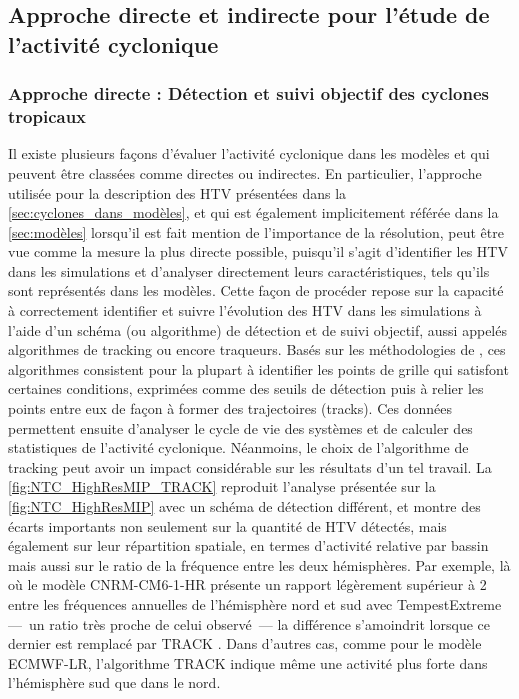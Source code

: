 \documentclass[../main.tex]{subfiles}
\begin{document}
\subsection{Approche directe et indirecte pour l'étude de l'activité cyclonique}\label{sec:tracking_vs_indices}

\subsubsection{Approche directe : Détection et suivi objectif des cyclones tropicaux}\label{sec:intro_tracking}

Il existe plusieurs façons d'évaluer l'activité cyclonique dans les modèles et qui peuvent être classées comme directes ou indirectes. En particulier,
l'approche utilisée pour la description des HTV présentées dans la \cref{sec:cyclones_dans_modèles}, et qui est également implicitement référée dans la
\cref{sec:modèles} lorsqu'il est fait mention de l'importance de la résolution, peut être vue comme la mesure la plus directe possible, puisqu'il s'agit
d'identifier les HTV dans les simulations et d'analyser directement leurs caractéristiques, tels qu'ils sont représentés dans les modèles. Cette façon de
procéder repose sur la capacité à correctement identifier et suivre l'évolution des HTV dans les simulations à l'aide d'un schéma (ou algorithme) de détection
et de suivi objectif, aussi appelés algorithmes de tracking ou encore traqueurs. Basés sur les méthodologies de
\cite{haarsma_tropical_1993,bengtsson_hurricanetype_1995}, ces algorithmes consistent pour la plupart à identifier les points de grille qui satisfont certaines
conditions, exprimées comme des seuils de détection puis à relier les points entre eux de façon à former des trajectoires (tracks). Ces données permettent
ensuite d'analyser le cycle de vie des systèmes et de calculer des statistiques de l'activité cyclonique. Néanmoins, le choix de l'algorithme de tracking peut
avoir un impact considérable sur les résultats d'un tel travail. La \cref{fig:NTC_HighResMIP_TRACK} reproduit l'analyse présentée sur la
\cref{fig:NTC_HighResMIP} avec un schéma de détection différent, et montre des écarts importants non seulement sur la quantité de HTV détectés, mais également
sur leur répartition spatiale, en termes d'activité relative par bassin mais aussi sur le ratio de la fréquence entre les deux hémisphères. Par exemple, là où
le modèle CNRM-CM6-1-HR présente un rapport légèrement supérieur à \num{2} entre les fréquences annuelles de l'hémisphère nord et sud avec TempestExtreme
\parencite{ullrich_tempestextremes_2017,zarzycki_assessing_2017} ---~un ratio très proche de celui observé~--- la différence s'amoindrit lorsque ce dernier est
remplacé par TRACK \parencite{hodges_how_2017}. Dans d'autres cas, comme pour le modèle ECMWF-LR, l'algorithme TRACK indique même une activité plus forte dans
l'hémisphère sud que dans le nord.
\end{document}
